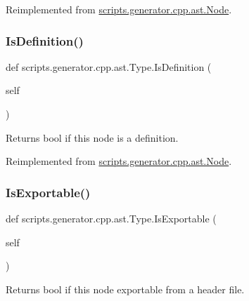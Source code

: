 Reimplemented from \mbox{\hyperlink{classscripts_1_1generator_1_1cpp_1_1ast_1_1_node_a47bce3a2a7212267bc0171fff16fc459}{scripts.\+generator.\+cpp.\+ast.\+Node}}.

\mbox{\label{classscripts_1_1generator_1_1cpp_1_1ast_1_1_type_adb1f8318a4511dd75165f0b7fff9f588}} 
\subsubsection{\texorpdfstring{IsDefinition()}{IsDefinition()}}
{\footnotesize\ttfamily def scripts.\+generator.\+cpp.\+ast.\+Type.\+Is\+Definition (\begin{DoxyParamCaption}\item[{}]{self }\end{DoxyParamCaption})}

\begin{DoxyVerb}Returns bool if this node is a definition.\end{DoxyVerb}
 

Reimplemented from \mbox{\hyperlink{classscripts_1_1generator_1_1cpp_1_1ast_1_1_node_a53663c2acef5d6954d065e11d2fd53a1}{scripts.\+generator.\+cpp.\+ast.\+Node}}.

\mbox{\label{classscripts_1_1generator_1_1cpp_1_1ast_1_1_type_aa0c2d113f68d04b247025b9e2956a78c}} 
\subsubsection{\texorpdfstring{IsExportable()}{IsExportable()}}
{\footnotesize\ttfamily def scripts.\+generator.\+cpp.\+ast.\+Type.\+Is\+Exportable (\begin{DoxyParamCaption}\item[{}]{self }\end{DoxyParamCaption})}

\begin{DoxyVerb}Returns bool if this node exportable from a header file.\end{DoxyVerb}
 

